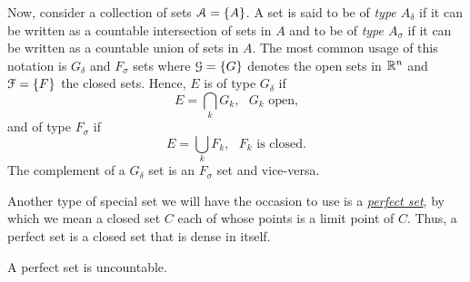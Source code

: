 Now, consider a collection of sets $\mathcal{A}=\{A\}$. A set is said to be of
\emph{type $A_\delta$} if it can be written as a countable intersection of
sets in $A$ and to be of \emph{type $A_\sigma$} if it can be written as a
countable union of sets in $A$. The most common usage of this notation is
$G_\delta$ and $F_\sigma$ sets where $\mathcal{G}=\{G\}$ denotes the open sets in
$\mathbb{R}^n$ and $\mathcal{F}=\{F\}$ the closed sets. Hence, $E$ is of type
\href{https://en.wikipedia.org/wiki/G-delta_set}{$G_\delta$} if
\begin{equation}
  \label{eq:1:g-delta-set}
E=\bigcap_k G_k,\text{ $G_k$ open,}
\end{equation}
and of type \href{https://en.wikipedia.org/wiki/F-sigma_set}{$F_\sigma$} if
\begin{equation}
  \label{eq:1:f-sigma}
E=\bigcup_k F_k,\text{ $F_k$ is closed.}
\end{equation}
The complement of a $G_\delta$ set is an $F_\sigma$ set and vice-versa.

Another type of special set we will have the occasion to use is a
\href{https://en.wikipedia.org/wiki/Perfect_set}{\emph{perfect set}}, by
which we mean a closed set $C$ each of whose points is a limit point of
$C$. Thus, a perfect set is a closed set that is dense in itself.

\begin{theorem}[1.9]
A perfect set is uncountable.
\end{theorem}

